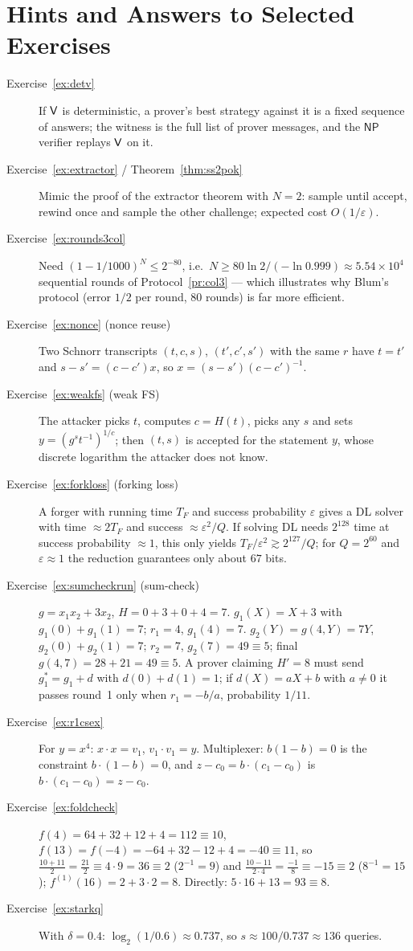 \documentclass[11pt,a4paper]{report}
\theoremstyle{plain}
\theoremstyle{definition}
\theoremstyle{remark}
\newcommand{\NP}{\mathsf{NP}}\newcommand{\BPP}{\mathsf{BPP}}\newcommand{\IP}{\mathsf{IP}}
\newcommand{\inv}{^{-1}}
\begin{document}
\chapter{Hints and Answers to Selected Exercises}
\begin{description}
\item[Exercise~\ref{ex:detv}] If $\mathsf{V}$ is deterministic, a prover's best strategy against it is a fixed sequence of answers; the witness is the full list of prover messages, and the $\NP$ verifier replays $\mathsf{V}$ on it.
\item[Exercise~\ref{ex:extractor} / Theorem~\ref{thm:ss2pok}] Mimic the proof of the extractor theorem with $N=2$: sample until accept, rewind once and sample the other challenge; expected cost $O(1/\varepsilon)$.
\item[Exercise~\ref{ex:rounds3col}] Need $(1-1/1000)^N\le2^{-80}$, i.e.\ $N\ge80\ln2/(-\ln0.999)\approx5.54\times10^4$ sequential rounds of Protocol~\ref{pr:col3} --- which illustrates why Blum's protocol (error $1/2$ per round, $80$ rounds) is far more efficient.
\item[Exercise~\ref{ex:nonce} (nonce reuse)] Two Schnorr transcripts $(t,c,s)$, $(t',c',s')$ with the same $r$ have $t=t'$ and $s-s'=(c-c')x$, so $x=(s-s')(c-c')^{-1}$.
\item[Exercise~\ref{ex:weakfs} (weak FS)] The attacker picks $t$, computes $c=H(t)$, picks any $s$ and sets $y=(g^st^{-1})^{1/c}$; then $(t,s)$ is accepted for the statement $y$, whose discrete logarithm the attacker does not know.
\item[Exercise~\ref{ex:forkloss} (forking loss)] A forger with running time $T_F$ and success probability $\varepsilon$ gives a DL solver with time $\approx2T_F$ and success $\approx\varepsilon^2/Q$. If solving DL needs $2^{128}$ time at success probability $\approx1$, this only yields $T_F/\varepsilon^2\gtrsim2^{127}/Q$; for $Q=2^{60}$ and $\varepsilon\approx1$ the reduction guarantees only about $67$ bits.
\item[Exercise~\ref{ex:sumcheckrun} (sum-check)] $g=x_1x_2+3x_2$, $H=0+3+0+4=7$. $g_1(X)=X+3$ with $g_1(0)+g_1(1)=7$; $r_1=4$, $g_1(4)=7$. $g_2(Y)=g(4,Y)=7Y$, $g_2(0)+g_2(1)=7$; $r_2=7$, $g_2(7)=49\equiv5$; final $g(4,7)=28+21=49\equiv5$. A prover claiming $H'=8$ must send $g_1^*=g_1+d$ with $d(0)+d(1)=1$; if $d(X)=aX+b$ with $a\ne0$ it passes round~1 only when $r_1=-b/a$, probability $1/11$.
\item[Exercise~\ref{ex:r1csex}] For $y=x^4$: $x\cdot x=v_1$, $v_1\cdot v_1=y$. Multiplexer: $b(1-b)=0$ is the constraint $b\cdot(1-b)=0$, and $z-c_0=b\cdot(c_1-c_0)$ is $b\cdot(c_1-c_0)=z-c_0$.
\item[Exercise~\ref{ex:foldcheck}] $f(4)=64+32+12+4=112\equiv10$, $f(13)=f(-4)=-64+32-12+4=-40\equiv11$, so $\frac{10+11}2=\frac{21}2\equiv4\cdot9=36\equiv2$ ($2\inv=9$) and $\frac{10-11}{2\cdot4}=\frac{-1}8\equiv-15\equiv2$ ($8\inv=15$); $f^{(1)}(16)=2+3\cdot2=8$. Directly: $5\cdot16+13=93\equiv8$. \checkmark
\item[Exercise~\ref{ex:starkq}] With $\delta=0.4$: $\log_2(1/0.6)\approx0.737$, so $s\approx100/0.737\approx136$ queries.
\end{description}
\end{document}
